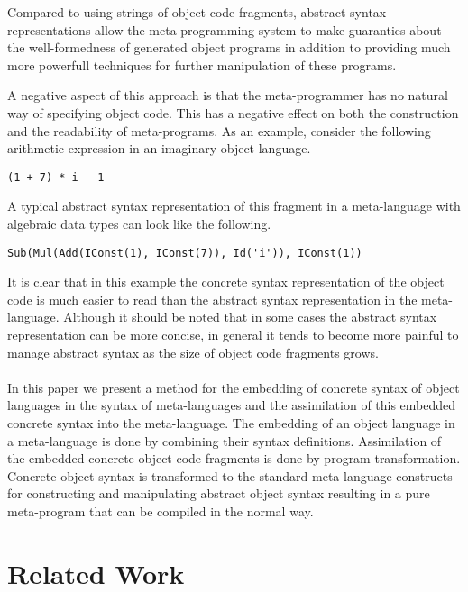 \documentclass[a4paper,11pt]{article}
\begin{document}
Compared to using strings of object code fragments, abstract syntax
representations allow the meta-programming system to make guaranties about the
well-formedness of generated object programs in addition to providing much more
powerfull techniques for further manipulation of these programs.

A negative aspect of this approach is that the meta-programmer has no natural
way of specifying object code. This has a negative effect on both the
construction and the readability of meta-programs. As an example, consider the
following arithmetic expression in an imaginary object language.
\begin{lstlisting}[title=Example expression in concrete syntax]
(1 + 7) * i - 1
\end{lstlisting}
A typical abstract syntax representation of this fragment in a meta-language
with algebraic data types can look like the following.
\begin{lstlisting}[title=Example expression in abstract syntax]
Sub(Mul(Add(IConst(1), IConst(7)), Id('i')), IConst(1))
\end{lstlisting}
It is clear that in this example the concrete syntax representation of the
object code is much easier to read than the abstract syntax representation in
the meta-language. Although it should be noted that in some cases the abstract
syntax representation can be more concise, in general it tends to become more
painful to manage abstract syntax as the size of object code fragments grows.

\paragraph{}

In this paper we present a method for the embedding of concrete syntax of
object languages in the syntax of meta-languages and the assimilation of this
embedded concrete syntax into the meta-language. The embedding of an object
language in a meta-language is done by combining their syntax definitions.
Assimilation of the embedded concrete object code fragments is done by program
transformation. Concrete object syntax is transformed to the standard
meta-language constructs for constructing and manipulating abstract object
syntax resulting in a pure meta-program that can be compiled in the normal
way.


\section{Related Work}\label{sec:related}
\end{document}
